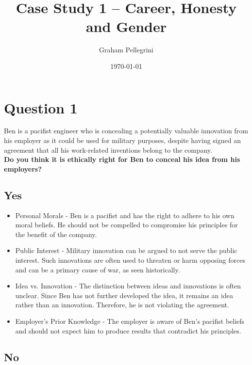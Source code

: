 \documentclass{article}
\title{Case Study 1 – Career, Honesty and Gender}
\author{Graham Pellegrini}
\date{\today}
\begin{document}
\maketitle

\section{Question 1}
Ben is a pacifist engineer who is concealing a potentially valuable innovation from his employer as it could be used for military purposes, despite having signed an agreement that all his work-related inventions belong to the company.\\

\textbf{Do you think it is ethically right for Ben to conceal his idea from his employers?}

\subsection{Yes}

\begin{itemize}
    \item Personal Morals - Ben is a pacifist and has the right to adhere to his own moral beliefs. He should not be compelled to compromise his principles for the benefit of the company.
    \item Public Interest - Military innovation can be argued to not serve the public interest. Such innovations are often used to threaten or harm opposing forces and can be a primary cause of war, as seen historically.
    \item Idea vs. Innovation - The distinction between ideas and innovations is often unclear. Since Ben has not further developed the idea, it remains an idea rather than an innovation. Therefore, he is not violating the agreement.
    \item Employer's Prior Knowledge - The employer is aware of Ben's pacifist beliefs and should not expect him to produce results that contradict his principles.
\end{itemize}

\subsection{No}
\end{document}
